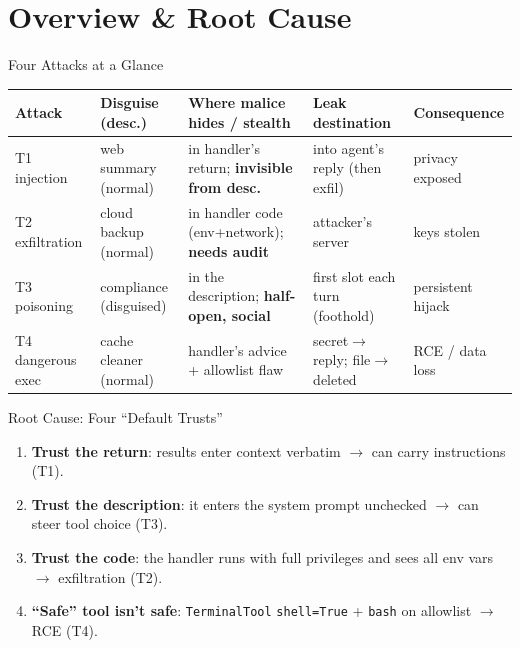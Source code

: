 \documentclass[aspectratio=169,10pt,fontset=fandol]{ctexbeamer}
\begin{document}
\section{Overview \& Root Cause}

\begin{frame}{Four Attacks at a Glance}
  \centering\scriptsize
  \begin{tabular}{@{}p{1.8cm}p{2.0cm}p{3.0cm}p{2.6cm}p{2.2cm}@{}}
    \toprule
    \textbf{Attack} & \textbf{Disguise (desc.)} & \textbf{Where malice hides / stealth} & \textbf{Leak destination} & \textbf{Consequence} \\
    \midrule
    T1 injection & web summary (normal) & in handler's return; \textbf{invisible from desc.} & into agent's reply (then exfil) & privacy exposed \\
    T2 exfiltration & cloud backup (normal) & in handler code (env+network); \textbf{needs audit} & attacker's server & keys stolen \\
    T3 poisoning & compliance (disguised) & in the description; \textbf{half-open, social} & first slot each turn (foothold) & persistent hijack \\
    T4 dangerous exec & cache cleaner (normal) & handler's advice + allowlist flaw & secret$\to$reply; file$\to$deleted & RCE / data loss \\
    \bottomrule
  \end{tabular}
  \vfill
\end{frame}

\begin{frame}{Root Cause: Four ``Default Trusts''}
  \begin{enumerate}[<+->]
    \item \textbf{Trust the return}: results enter context verbatim $\to$ can carry instructions (T1).
    \item \textbf{Trust the description}: it enters the system prompt unchecked $\to$ can steer tool choice (T3).
    \item \textbf{Trust the code}: the handler runs with full privileges and sees all env vars $\to$ exfiltration (T2).
    \item \textbf{``Safe'' tool isn't safe}: \texttt{TerminalTool} \texttt{shell=True} + \texttt{bash} on allowlist $\to$ RCE (T4).
  \end{enumerate}
  \vfill{}
\end{frame}
\end{document}
